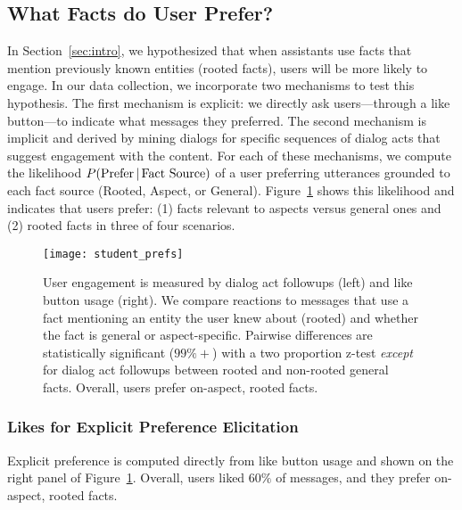 \subsection{What Facts do User Prefer?}

In Section~\ref{sec:intro}, we hypothesized that when assistants use facts that mention previously known entities (rooted facts), users will be more likely to engage.
In our data collection, we incorporate two mechanisms to test this hypothesis.
The first mechanism is explicit: we directly ask users---through a like button---to indicate what messages they preferred.
The second mechanism is implicit and derived by mining dialogs for specific sequences of dialog acts that suggest engagement with the content.
For each of these mechanisms, we compute the likelihood $P(\text{Prefer}\, | \,\text{Fact Source})$ of a user preferring utterances grounded to each fact source (Rooted, Aspect, or General).
Figure~\ref{fig:prefs} shows this likelihood and indicates that users prefer: (1) facts relevant to aspects versus general ones and (2) rooted facts in three of four scenarios.

\begin{figure}[t]
    \centering
    \texttt{[image: student\_prefs]}
    \caption{
        User engagement is measured by dialog act followups (left) and like button usage (right).
        We compare reactions to messages that use a fact mentioning an entity the user knew about (rooted) and whether the fact is general or aspect-specific.
        Pairwise differences are statistically significant ($99\%+$) with a two proportion z-test \emph{except} for dialog act followups between rooted and non-rooted general facts.
        Overall, users prefer on-aspect, rooted facts.
    }
    \vspace{-12pt}
    \label{fig:prefs}
\end{figure}

\subsubsection{Likes for Explicit Preference Elicitation}
Explicit preference is computed directly from like button usage and shown on the right panel of Figure~\ref{fig:prefs}.
Overall, users liked $60\%$ of messages, and they prefer on-aspect, rooted facts.

